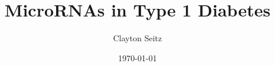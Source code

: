 \documentclass[aspectratio=169]{beamer}
\begin{document}
\title{MicroRNAs in Type 1 Diabetes}  
\author{Clayton Seitz}
\date{\today} 

\maketitle


\begin{frame}

\end{frame}




\begin{thebibliography}{99} 
\end{thebibliography}
\end{document}

